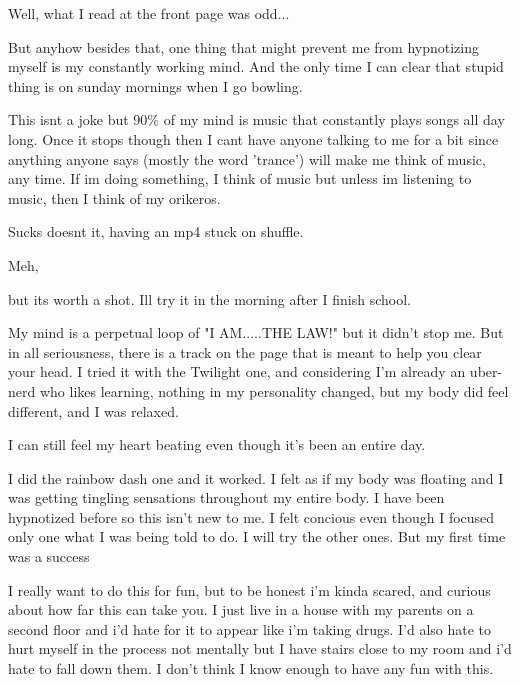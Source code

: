 \documentclass[ebook,12pt,oneside,openany]{memoir}
\begin{document}
\begin{tcolorbox}[title=Harmonic Revelations,colback=brown!5!white,colframe=brown!75!black,coltitle=white]
\begin{tcolorbox}[title=Moon Wave]
\par{Well, what I read at the front page was odd...}
\par{But anyhow besides that, one thing that might prevent me from hypnotizing myself is my constantly working mind. And the only time I can clear that stupid thing is on sunday mornings when I go bowling.}
\par{This isnt a joke but 90\% of my mind is music that constantly plays songs all day long. Once it stops though then I cant have anyone talking to me for a bit since anything anyone says (mostly the word 'trance') will make me think of music, any time. If im doing something, I think of music but unless im listening to music, then I think of my orikeros.}
\par{Sucks doesnt it, having an mp4 stuck on shuffle.}
\par{Meh,}
\par{but its worth a shot. Ill try it in the morning after I finish school.}
\end{tcolorbox}
\par{My mind is a perpetual loop of "I AM.....THE LAW!" but it didn't stop me. But in all seriousness, there is a track on the page that is meant to help you clear your head. I tried it with the Twilight one, and considering I'm already an uber-nerd who likes learning, nothing in my personality changed, but my body did feel different, and I was relaxed.}
\newline{}
\newline{}
\par{I can still feel my heart beating even though it's been an entire day.}
\end{tcolorbox}
\begin{tcolorbox}[title=TheMarkz0ne]
\par{I did the rainbow dash one and it worked. I felt as if my body was floating and I was getting tingling sensations throughout my entire body. I have been hypnotized before so this isn't new to me. I felt concious even though I focused only one what I was being told to do. I will try the other ones. But my first time was a success}
\end{tcolorbox}
\begin{tcolorbox}[title=TheFlowerPoison]
\par{I really want to do this for fun, but to be honest i'm kinda scared, and curious about how far this can take you. I just live in a house with my parents on a second floor and i'd hate for it to appear like i'm taking drugs. I'd also hate to hurt myself in the process not mentally but I have stairs close to my room and i'd hate to fall down them. I don't think I know enough to have any fun with this.}
\end{tcolorbox}
\end{document}
